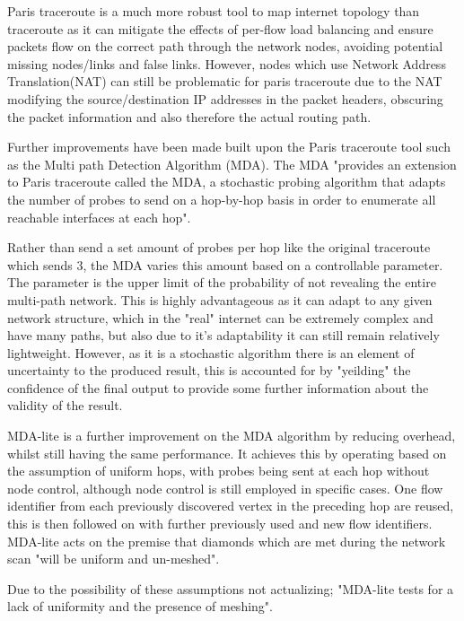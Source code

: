 Paris traceroute is a much more robust tool to map internet topology than traceroute as it can mitigate the effects of per-flow load balancing and ensure packets flow on the correct path through the network nodes, avoiding potential missing nodes/links and false links. However, nodes which use Network Address Translation(NAT) can still be problematic for paris traceroute due to the NAT modifying the source/destination IP addresses in the packet headers, obscuring the packet information and also therefore the actual routing path. \cite{anomalies}

Further improvements have been made built upon the Paris traceroute tool such as the Multi path Detection Algorithm (MDA). The MDA "provides an extension to Paris traceroute called the MDA, a stochastic probing algorithm that adapts the number of
probes to send on a hop-by-hop basis in order to enumerate all reachable interfaces at each hop". \cite{MDA2}

Rather than send a set amount of probes per hop like the original traceroute which sends 3, the MDA varies this amount based on a controllable parameter. \cite{MDA2} The parameter is the upper limit of the probability of not revealing the entire multi-path network. This is highly advantageous as it can adapt to any given network structure, which in the "real" internet can be extremely complex and have many paths, but also due to it's adaptability it can still remain relatively lightweight. However, as it is a stochastic algorithm there is an element of uncertainty to the produced result, this is accounted for by "yeilding" the  confidence of the final output to provide some further information about the validity of the result. \cite{MDA-lite}\cite{diamond-miner}\cite{MDA3}

MDA-lite is a further improvement on the MDA algorithm by reducing overhead, whilst still having the same performance. It achieves this by operating based on the assumption of uniform hops, with probes being sent at each hop without node control, although node control is still employed in specific cases. One flow identifier from each previously discovered vertex in the preceding hop are reused, this is then followed on with further previously used and new flow identifiers. MDA-lite acts on the premise that diamonds which are met during the network scan "will be uniform and un-meshed". \cite{MDA-lite} 

Due to the possibility of these assumptions not actualizing; "MDA-lite tests for a lack of uniformity and the presence of meshing". \cite{MDA-lite} 

